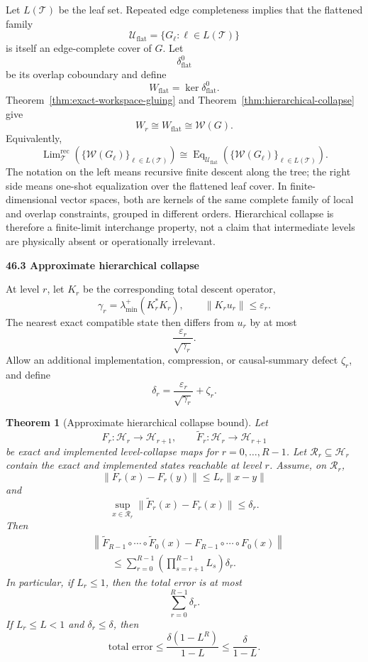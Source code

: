 \documentclass[11pt,letterpaper]{article}
\newcommand{\subtopic}[1]{%
 \vspace{0.45em}
 {\bfseries\color{AccentColor} #1\par}
}
\theoremstyle{plain}
\newtheorem{theorem}{Theorem}
\theoremstyle{definition}
\begin{document}
Let \(L(\mathcal T)\) be the leaf set. Repeated edge completeness implies that
the flattened family
\[
\mathcal U_{\mathrm{flat}}
=
\{G_\ell:\ell\in L(\mathcal T)\}
\]
is itself an edge-complete cover of \(G\). Let
\[
\delta_{\mathrm{flat}}^0
\]
be its overlap coboundary and define
\[
W_{\mathrm{flat}}
=
\ker\delta_{\mathrm{flat}}^0.
\]
Theorem~\ref{thm:exact-workspace-gluing} and
Theorem~\ref{thm:hierarchical-collapse} give
\[
\boxed{
W_r
\cong
W_{\mathrm{flat}}
\cong
\mathscr W(G).
}
\]
Equivalently,
\[
\boxed{
\operatorname{Lim}_{\mathcal T}^{\mathrm{rec}}
\left(
\{\mathscr W(G_\ell)\}_{\ell\in L(\mathcal T)}
\right)
\cong
\operatorname{Eq}_{\mathcal U_{\mathrm{flat}}}
\left(
\{\mathscr W(G_\ell)\}_{\ell\in L(\mathcal T)}
\right).
}
\]
The notation on the left means recursive finite descent along the tree; the
right side means one-shot equalization over the flattened leaf cover. In
finite-dimensional vector spaces, both are kernels of the same complete family
of local and overlap constraints, grouped in different orders. Hierarchical
collapse is therefore a finite-limit interchange property, not a claim that
intermediate levels are physically absent or operationally irrelevant.

\subtopic{46.3 Approximate hierarchical collapse}

At level \(r\), let \(K_r\) be the corresponding total descent operator,
\[
\gamma_r
=
\lambda_{\min}^+(K_r^*K_r),
\qquad
\|K_ru_r\|\leq\varepsilon_r.
\]
The nearest exact compatible state then differs from \(u_r\) by at most
\[
\frac{\varepsilon_r}{\sqrt{\gamma_r}}.
\]
Allow an additional implementation, compression, or causal-summary defect
\(\zeta_r\), and define
\[
\delta_r
=
\frac{\varepsilon_r}{\sqrt{\gamma_r}}
+
\zeta_r.
\]

\begin{theorem}[Approximate hierarchical collapse bound]\label{thm:approx-hierarchical-collapse}
Let
\[
F_r:\mathcal H_r\to\mathcal H_{r+1},
\qquad
\widetilde F_r:\mathcal H_r\to\mathcal H_{r+1}
\]
be exact and implemented level-collapse maps for
\(r=0,\ldots,R-1\). Let \(\mathcal R_r\subseteq\mathcal H_r\) contain the exact
and implemented states reachable at level \(r\). Assume, on \(\mathcal R_r\),
\[
\|F_r(x)-F_r(y)\|
\leq
L_r\|x-y\|
\]
and
\[
\sup_{x\in\mathcal R_r}
\|\widetilde F_r(x)-F_r(x)\|
\leq
\delta_r.
\]
Then
\[
\boxed{
\begin{aligned}
&\left\|
\widetilde F_{R-1}\circ\cdots\circ\widetilde F_0(x)
-
F_{R-1}\circ\cdots\circ F_0(x)
\right\|\\
&\qquad\leq
\sum_{r=0}^{R-1}
\left(
\prod_{s=r+1}^{R-1}L_s
\right)
\delta_r.
\end{aligned}
}
\]
In particular, if \(L_r\leq1\), then the total error is at most
\[
\sum_{r=0}^{R-1}\delta_r.
\]
If \(L_r\leq L<1\) and \(\delta_r\leq\delta\), then
\[
\boxed{
\text{total error}
\leq
\frac{\delta(1-L^R)}{1-L}
\leq
\frac{\delta}{1-L}.
}
\]
\end{theorem}
\end{document}
